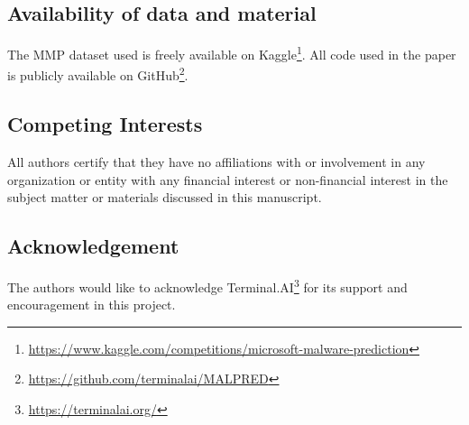 \documentclass[pdflatex,sn-basic,10pt]{sn-jnl}%
\begin{document}
\subsection*{Availability of data and material}

The MMP dataset used is freely available on Kaggle\footnote{\url{https://www.kaggle.com/competitions/microsoft-malware-prediction}}. All code used in the paper is publicly available on GitHub\footnote{\url{https://github.com/terminalai/MALPRED}}.

\subsection*{Competing Interests}
All authors certify that they have no affiliations with or involvement in any organization or entity with any financial interest or non-financial interest in the subject matter or materials discussed in this manuscript.

\subsection*{Acknowledgement}
The authors would like to acknowledge Terminal.AI\footnote{\url{https://terminalai.org/}} for its support and encouragement in this project.



\end{document}

